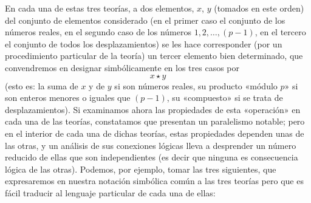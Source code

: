 \documentclass[a4paper, 12pt, draft]{article}
\begin{document}
En cada una de estas tres teorías, a dos elementos, $x$, $y$ (tomados en este orden) del conjunto de elementos considerado (en el primer caso el conjunto de los números reales, en el segundo caso de los números $1, 2,\dots, (p-1)$, en el tercero el conjunto de todos los desplazamientos) se les hace corresponder (por un procedimiento particular de la teoría) un tercer elemento bien determinado, que convendremos en designar simbólicamente en los tres casos por $$ x\star y $$ (esto es: la suma de $x$ y de $y$ si son números reales, su producto «módulo $p$» si son enteros menores o iguales que $(p-1)$, su «compuesto» si se trata de desplazamientos). Si examinamos ahora las propiedades de esta «operación» en cada una de las teorías, constatamos que presentan un paralelismo notable; pero en el interior de cada una de dichas teorías, estas propiedades dependen unas de las otras, y un análisis de sus conexiones lógicas lleva a desprender un número reducido de ellas que son independientes (es decir que ninguna es consecuencia lógica de las otras). Podemos, por ejemplo, tomar las tres siguientes, que expresaremos en nuestra notación simbólica común a las tres teorías pero que es fácil traducir al lenguaje particular de cada una de ellas: 
\end{document}
